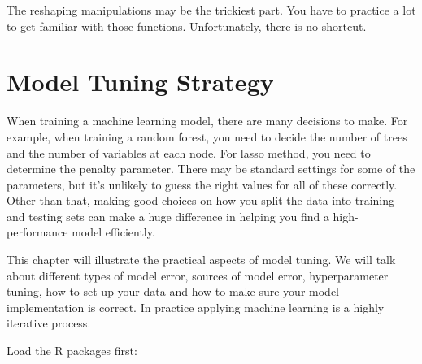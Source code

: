 \documentclass[12pt,]{krantz}
\makeatletter
\newenvironment{Shaded}{\begin{snugshade}}{\end{snugshade}}
\newcommand{\CommentTok}[1]{\textcolor[rgb]{0.37,0.37,0.37}{\textit{#1}}}
\newcommand{\ControlFlowTok}[1]{\textcolor[rgb]{0.27,0.27,0.27}{\textbf{#1}}}
\newcommand{\DataTypeTok}[1]{\textcolor[rgb]{0.27,0.27,0.27}{#1}}
\newcommand{\DecValTok}[1]{\textcolor[rgb]{0.06,0.06,0.06}{#1}}
\newcommand{\KeywordTok}[1]{\textcolor[rgb]{0.27,0.27,0.27}{\textbf{#1}}}
\newcommand{\NormalTok}[1]{#1}
\newcommand{\OperatorTok}[1]{\textcolor[rgb]{0.43,0.43,0.43}{\textbf{#1}}}
\newcommand{\OtherTok}[1]{\textcolor[rgb]{0.37,0.37,0.37}{#1}}
\newcommand{\StringTok}[1]{\textcolor[rgb]{0.5,0.5,0.5}{#1}}
\newenvironment{kframe}{%
\medskip{}
\setlength{\fboxsep}{.8em}
 \def\at@end@of@kframe{}%
 \ifinner\ifhmode%
  \def\at@end@of@kframe{\end{minipage}}%
  \begin{minipage}{\columnwidth}%
 \fi\fi%
 \def\FrameCommand##1{\hskip\@totalleftmargin \hskip-\fboxsep
 \colorbox{shadecolor}{##1}\hskip-\fboxsep
     \hskip-\linewidth \hskip-\@totalleftmargin \hskip\columnwidth}%
 \MakeFramed {\advance\hsize-\width
   \@totalleftmargin\z@ \linewidth\hsize
   \@setminipage}}%
 {\par\unskip\endMakeFramed%
 \at@end@of@kframe}
\renewenvironment{Shaded}{\begin{kframe}}{\end{kframe}}
\makeatother
\begin{document}
The reshaping manipulations may be the trickiest part. You have to practice a lot to get familiar with those functions. Unfortunately, there is no shortcut.

\hypertarget{modeltuningstrategy}{%
\chapter{Model Tuning Strategy}\label{modeltuningstrategy}}

When training a machine learning model, there are many decisions to make. For example, when training a random forest, you need to decide the number of trees and the number of variables at each node. For lasso method, you need to determine the penalty parameter. There may be standard settings for some of the parameters, but it's unlikely to guess the right values for all of these correctly. Other than that, making good choices on how you split the data into training and testing sets can make a huge difference in helping you find a high-performance model efficiently.

This chapter will illustrate the practical aspects of model tuning. We will talk about different types of model error, sources of model error, hyperparameter tuning, how to set up your data and how to make sure your model implementation is correct. In practice applying machine learning is a highly iterative process.

Load the R packages first:

\begin{Shaded}
\end{Shaded}
\end{document}
